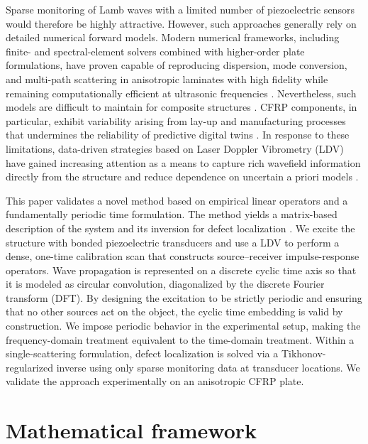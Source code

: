 \documentclass[a4paper,fleqn]{cas-sc}
\begin{document}
Sparse monitoring of Lamb waves with a limited number of piezoelectric sensors \cite{Lamb_wave_transducer} would therefore be highly attractive. However, such approaches generally rely on detailed numerical forward models. Modern numerical frameworks, including finite- and spectral-element solvers combined with higher-order plate formulations, have proven capable of reproducing dispersion, mode conversion, and multi-path scattering in anisotropic laminates with high fidelity while remaining computationally efficient at ultrasonic frequencies \cite{Calomfirescu2008,Kudela2024}. Nevertheless, such models are difficult to maintain for composite structures \cite{Modelling_Challenges,OG_Lamb_wave}. CFRP components, in particular, exhibit variability arising from lay-up and manufacturing processes that undermines the reliability of predictive digital twins \cite{Manufacturing_Variability_Problems,CFRP_Defects}. In response to these limitations, data-driven strategies based on Laser Doppler Vibrometry (LDV) have gained increasing attention as a means to capture rich wavefield information directly from the structure and reduce dependence on uncertain a priori models \cite{LDV_SHM_CFRP, Thomsen2024}.

This paper validates a novel method based on empirical linear operators \cite{Matrix_use_in_ndt,Touchscreen} and a fundamentally periodic time formulation. The method yields a matrix-based description of the system and its inversion for defect localization \cite{inversion_method_1}. We excite the structure with bonded piezoelectric transducers and use a LDV to perform a dense, one-time calibration scan that constructs source--receiver impulse-response operators. Wave propagation is represented on a discrete cyclic time axis so that it is modeled as circular convolution, diagonalized by the discrete Fourier transform (DFT).
By designing the excitation to be strictly periodic and ensuring that no other sources act on the object, the cyclic time embedding is valid by construction. We impose periodic behavior in the experimental setup, making the frequency-domain treatment equivalent to the time-domain treatment.
Within a single-scattering formulation, defect localization is solved via a Tikhonov-regularized inverse \cite{Tikhonov,Tikhonov_matrix} using only sparse monitoring data at transducer locations. We validate the approach experimentally on an anisotropic CFRP plate.

\section{Mathematical framework}\label{Mathematical framework}
\end{document}
